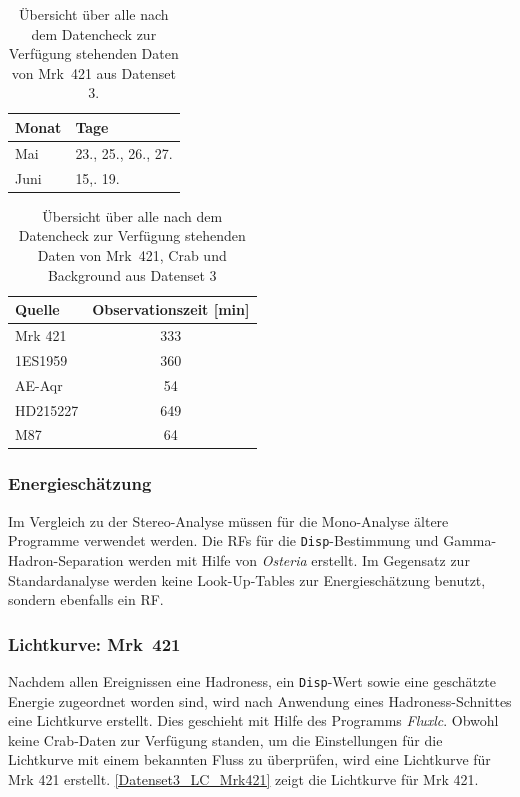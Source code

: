 \begin{table}[!h]
\centering
\caption{Übersicht über alle nach dem Datencheck zur Verfügung stehenden Daten von Mrk~421 aus Datenset 3.}
\label{tab:Datenset3-Mrk421}
\begin{tabular}{ll}
  \toprule
  Monat & Tage\\
  \midrule
  \midrule
Mai & 23., 25., 26., 27.\\
Juni & 15,. 19. \\
  \bottomrule
\end{tabular}
\end{table}


\begin{table}[!h]
\centering
\caption{Übersicht über alle nach dem Datencheck zur Verfügung stehenden Daten von Mrk~421, Crab und Background aus Datenset 3}
\label{tab:Datenset3}
\begin{tabular}{lc}
  \toprule
  Quelle & Observationszeit [min]\\
  \midrule
  \midrule
  Mrk 421 & 333\\
  \midrule
  1ES1959 & 360 \\
  AE-Aqr & 54  \\
  HD215227 & 649 \\
  M87 & 64 \\
  \bottomrule
  \bottomrule
\end{tabular}
\end{table}

\subsubsection{Energieschätzung}
Im Vergleich zu der Stereo-Analyse müssen für die Mono-Analyse ältere Programme verwendet werden.
Die RFs für die \texttt{Disp}-Bestimmung und Gamma-Hadron-Separation werden mit Hilfe von \textit{Osteria} erstellt.
Im Gegensatz zur Standardanalyse werden keine Look-Up-Tables zur Energieschätzung benutzt, sondern ebenfalls ein RF.

\subsubsection{Lichtkurve: Mrk~421}
Nachdem allen Ereignissen eine Hadroness, ein \texttt{Disp}-Wert sowie eine geschätzte Energie zugeordnet worden sind, wird nach Anwendung eines Hadroness-Schnittes eine Lichtkurve erstellt.
Dies geschieht mit Hilfe des Programms \textit{Fluxlc}.
Obwohl keine Crab-Daten zur Verfügung standen, um die Einstellungen für die Lichtkurve mit einem bekannten Fluss zu überprüfen, wird eine Lichtkurve für Mrk 421 erstellt.
\autoref{Datenset3_LC_Mrk421} zeigt die Lichtkurve für Mrk 421.

